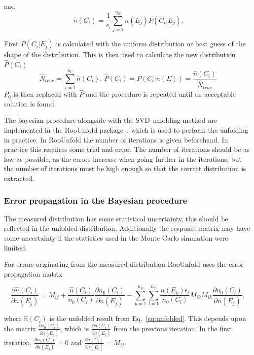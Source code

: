 and 
\begin{equation}
\hat n\left(C_i\right) = \frac{1}{\epsilon_i} \sum_{j=1}^{n_E}n\left(E_j\right)P\left(C_i | E_j\right).
\label{eq:unfolded}
\end{equation}

First  $P\left(C_i |E_j\right)$ is calculated with the uniform distribution or best guess of the shape of the distribution. This is then used to calculate the new distribution $\hat P\left(C_i\right)$
$$\hat N_{true} = \sum_{i=1}^{n_C} \hat n\left(C_i\right),\,\hat P\left(C_i\right) = P\left(C_i | n\left(E\right)\right) = \frac{\hat n\left(C_i\right)}{\hat N_{true}}$$
$P_0$ is then replaced with $\hat P$ and the procedure is repeated until an acceptable solution is found. 

The bayesian procedure alongside with the SVD unfolding method are implemented in the RooUnfold package~\cite{roounfold}, which is used to perform the unfolding in practice. In RooUnfold the number of iterations is given beforehand. In practice this requires some trial and error. The number of iterations should be as low as possible, as the errors increase when going further in the iterations, but the number of iterations must be high enough so that the correct distribution is extracted. 
 
 \subsubsection*{Error propagation in the Bayesian procedure }
 The measured distribution has some statistical uncertainty, this should be reflected in the unfolded distribution. Additionally the response matrix may have some uncertainty if the statistics used in the Monte Carlo simulation were limited. 
 
For errors originating from the measured distribution RooUnfold uses the error propagation matrix 

\begin{equation}
\frac{\partial \hat n\left(C_i\right)}{\partial n\left(E_j\right)} = M_{ij} + \frac{\hat n\left(C_i\right)}{n_0\left(C_i\right)}\frac{\partial n_0\left(C_i\right) }{\partial n\left(E_j\right) } - \sum_{k=1}^{n_E}\sum_{l=1}^{n_C} \frac{n\left(E_k\right) \epsilon_l}{n_0\left(C_l\right)} M_{ik} M_{lk} \frac{\partial n_0 \left(C_l\right)}{\partial n\left(E_j\right)},
\end{equation} 
 
 where $\hat n \left(C_i\right)$ is the unfolded result from Eq.~\ref{eq:unfolded}. This depends upon the matrix $\frac{\partial n_0\left(C_i\right)}{\partial n\left(E_j\right) }$, which is $\frac{\partial \hat n\left(C_i\right) }{\partial n\left(E_j\right) }$ from the previous iteration. In the first iteration, $\frac{\partial n_0\left(C_i\right) }{\partial n\left(E_j\right) }=0$ and $\frac{\partial \hat n\left(C_i\right) }{\partial n\left(E_j\right) } = M_{ij}$.
 
